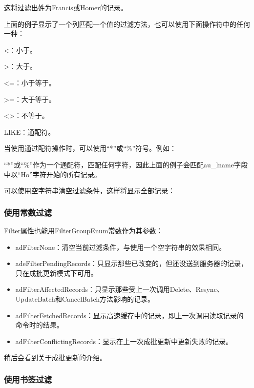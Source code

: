 
这将过滤出姓为Francis或Homer的记录。

上面的例子显示了一个列匹配一个值的过滤方法，也可以使用下面操作符中的任何一种：

{\textless}：小于。

{\textgreater}：大于。

{\textless}=：小于等于。

{\textgreater}=：大于等于。

{\textless}{\textgreater}：不等于。

LIKE：通配符。

当使用通过配符操作时，可以使用``*''或``\%''符号。例如：


``*''或``\%''作为一个通配符，匹配任何字符，因此上面的例子会匹配au\_lname字段中以``Ho''字符开始的所有记录。

可以使用空字符串清空过滤条件，这样将显示全部记录：


\subsubsection{使用常数过滤}

Filter属性也能用FilterGroupEnum常数作为其参数：
\begin{itemize}[]
\item adFilterNone：清空当前过滤条件，与使用一个空字符串的效果相同。

\item adeFilterPendingRecords：只显示那些已改变的，但还没送到服务器的记录，只在成批更新模式下可用。

\item adFilterAffectedRecords：只显示那些受上一次调用Delete、Resync、UpdateBatch和CancelBatch方法影响的记录。

\item adFilterFetchedRecords：显示高速缓存中的记录，即上一次调用读取记录的命令时的结果。

\item adFilterConflictingRecords：显示在上一次成批更新中更新失败的记录。
\end{itemize}
稍后会看到关于成批更新的介绍。

\subsubsection{使用书签过滤}

